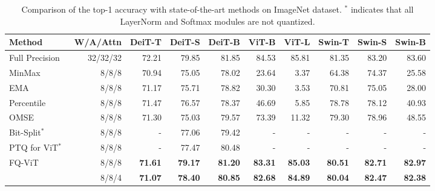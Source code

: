 \documentclass{article}
\begin{document}
\begin{table*}[t]
\centering
\small
\begin{tabular}{lrrrrrrrrr}
\toprule
Method            & W/A/Attn & DeiT-T         & DeiT-S         & DeiT-B         & ViT-B          & ViT-L          & Swin-T         & Swin-S         & Swin-B         \\
\midrule
\rowcolor{c_gray} Full Precision    & 32/32/32      & 72.21          & 79.85          & 81.85          & 84.53          & 85.81          & 81.35          & 83.20          & 83.60          \\
\midrule
MinMax            & 8/8/8         & 70.94          & 75.05          & 78.02          & 23.64          & 3.37           & 64.38          & 74.37          & 25.58          \\
EMA~\cite{jacob2018quantization}               & 8/8/8         & 71.17          & 75.71          & 78.82          & 30.30          & 3.53           & 70.81          & 75.05          & 28.00          \\
Percentile~\cite{li2019fully}        & 8/8/8         & 71.47          & 76.57          & 78.37          & 46.69          & 5.85           & 78.78          & 78.12          & 40.93          \\
OMSE~\cite{choukroun2019low}              & 8/8/8         & 71.30          & 75.03          & 79.57          & 73.39          & 11.32          & 79.30          & 78.96          & 48.55          \\
Bit-Split$^*$~\cite{wang2020towards}         & 8/8/8         & -              & 77.06          & 79.42          & -              & -              & -              & -              & -              \\
PTQ for ViT$^*$~\cite{liu2021post}       & 8/8/8         & -              & 77.47          & 80.48          & -              & -              & -              & -              & -              \\
\midrule
\multirow{2}{*}{FQ-ViT}      & 8/8/8         & \textbf{71.61} & \textbf{79.17} & \textbf{81.20} & \textbf{83.31} & \textbf{85.03} & \textbf{80.51} & \textbf{82.71} & \textbf{82.97} \\
 & 8/8/4         & \textbf{71.07} & \textbf{78.40} & \textbf{80.85} & \textbf{82.68} & \textbf{84.89} & \textbf{80.04} & \textbf{82.47} & \textbf{82.38} \\
\bottomrule
\end{tabular}
\caption{Comparison of the top-1 accuracy with state-of-the-art methods on ImageNet dataset. $^*$ indicates that all LayerNorm and Softmax modules are not quantized.}
\label{tab:img}
\end{table*}
\end{document}
